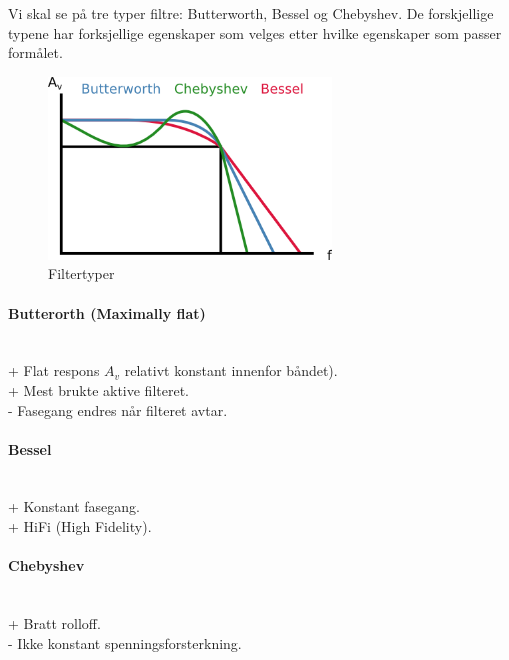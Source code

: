 Vi skal se på tre typer filtre: Butterworth, Bessel og Chebyshev.
De forskjellige typene har forksjellige egenskaper som velges etter
hvilke egenskaper som passer formålet.

\begin{figure}[H]
  \caption{Filtertyper}
  \centering
  \includegraphics[width=0.67\textwidth]{./img/filtertyper}
\end{figure}

\paragraph{Butterorth (Maximally flat)} \mbox{} \\
+ Flat respons $A_v$ relativt konstant innenfor båndet). \\
+ Mest brukte aktive filteret. \\
- Fasegang endres når filteret avtar.

\paragraph{Bessel} \mbox{} \\
+ Konstant fasegang. \\
+ HiFi (High Fidelity).

\paragraph{Chebyshev} \mbox{} \\
+ Bratt rolloff. \\
- Ikke konstant spenningsforsterkning.
